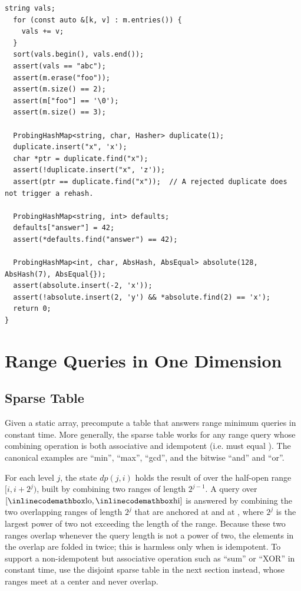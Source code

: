 \begin{lstlisting}[style=cpp]
  string vals;
  for (const auto &[k, v] : m.entries()) {
    vals += v;
  }
  sort(vals.begin(), vals.end());
  assert(vals == "abc");
  assert(m.erase("foo"));
  assert(m.size() == 2);
  assert(m["foo"] == '\0');
  assert(m.size() == 3);

  ProbingHashMap<string, char, Hasher> duplicate(1);
  duplicate.insert("x", 'x');
  char *ptr = duplicate.find("x");
  assert(!duplicate.insert("x", 'z'));
  assert(ptr == duplicate.find("x"));  // A rejected duplicate does not trigger a rehash.

  ProbingHashMap<string, int> defaults;
  defaults["answer"] = 42;
  assert(*defaults.find("answer") == 42);

  ProbingHashMap<int, char, AbsHash, AbsEqual> absolute(128, AbsHash(7), AbsEqual{});
  assert(absolute.insert(-2, 'x'));
  assert(!absolute.insert(2, 'y') && *absolute.find(2) == 'x');
  return 0;
}
\end{lstlisting}

\section{\texorpdfstring{Range Queries in One Dimension}{2.5 Range Queries in One Dimension}}
\setcounter{section}{5}
\setcounter{subsection}{0}
\subsection{Sparse Table}
\label{sec:2.5.1}
Given a static array, precompute a table that answers range minimum queries in constant time. More generally, the sparse table works for any range query whose combining operation is both associative and idempotent (i.e.  must equal ). The canonical examples are ``min'', ``max'', ``gcd'', and the bitwise ``and'' and ``or''.

For each level $j$, the state $dp(j, i)$ holds the result of  over the half-open range $[i, i + 2^j)$, built by combining two ranges of length $2^{j-1}$. A query over $[{\inlinecodemath{lo}}, {\inlinecodemath{hi}}]$ is answered by combining the two overlapping ranges of length $2^j$ that are anchored at  and at , where $2^j$ is the largest power of two not exceeding the length of the range. Because these two ranges overlap whenever the query length is not a power of two, the elements in the overlap are folded in twice; this is harmless only when  is idempotent. To support a non-idempotent but associative operation such as ``sum'' or ``XOR'' in constant time, use the disjoint sparse table in the next section instead, whose ranges meet at a center and never overlap.

